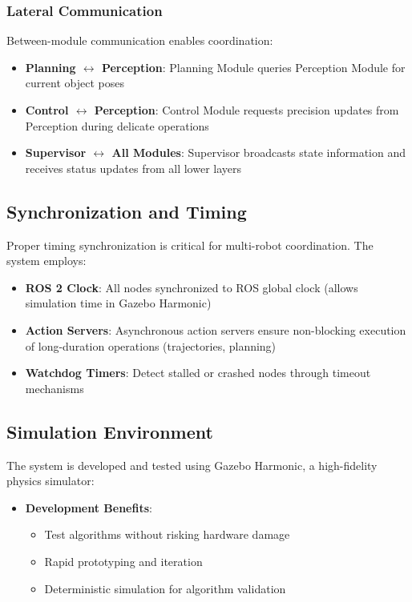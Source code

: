 \subsubsection{Lateral Communication}
Between-module communication enables coordination:
\begin{itemize}
    \item \textbf{Planning $\leftrightarrow$ Perception}: Planning Module queries Perception Module for current object poses
    \item \textbf{Control $\leftrightarrow$ Perception}: Control Module requests precision updates from Perception during delicate operations
    \item \textbf{Supervisor $\leftrightarrow$ All Modules}: Supervisor broadcasts state information and receives status updates from all lower layers
\end{itemize}

\subsection{Synchronization and Timing}
\label{subsec:synchronization_timing}

Proper timing synchronization is critical for multi-robot coordination. The system employs:

\begin{itemize}
    \item \textbf{ROS 2 Clock}: All nodes synchronized to ROS global clock (allows simulation time in Gazebo Harmonic)
    \item \textbf{Action Servers}: Asynchronous action servers ensure non-blocking execution of long-duration operations (trajectories, planning)
    \item \textbf{Watchdog Timers}: Detect stalled or crashed nodes through timeout mechanisms
\end{itemize}

\subsection{Simulation Environment}
\label{subsec:simulation_environment}

The system is developed and tested using Gazebo Harmonic, a high-fidelity physics simulator:

\begin{itemize}
    \item \textbf{Development Benefits}:
    \begin{itemize}
        \item Test algorithms without risking hardware damage
        \item Rapid prototyping and iteration
        \item Deterministic simulation for algorithm validation
    \end{itemize}
\end{itemize}

